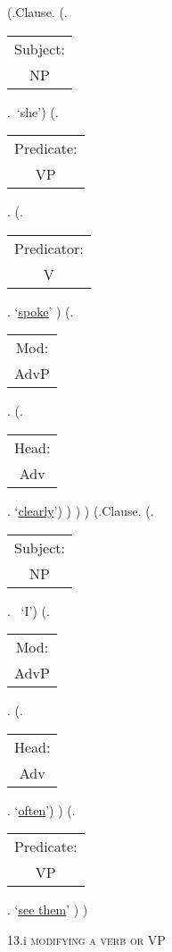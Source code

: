 \documentclass[12pt,letterpaper]{article}
\begin{document}
\begin{figure}
	\begin{center}
		\begin{parsetree}
			(.Clause.
			(.\begin{tabular}{c}Subject:\\NP\end{tabular}.~`she')
			(.\begin{tabular}{c}Predicate:\\VP\end{tabular}.
			(.\begin{tabular}{c}Predicator:\\V\end{tabular}. `\underline{\underline{spoke}}' )
			(.\begin{tabular}{c}Mod:\\AdvP\end{tabular}.  (.\begin{tabular}{c}Head:\\Adv\end{tabular}. `\underline{clearly}')
			)
			)
			)
			(.Clause.
			(.\begin{tabular}{c}Subject:\\NP\end{tabular}. ~`I')
			(.\begin{tabular}{c}Mod:\\AdvP\end{tabular}.  (.\begin{tabular}{c}Head:\\Adv\end{tabular}. `\underline{often}')
			)
			(.\begin{tabular}{c}Predicate:\\VP\end{tabular}. `\underline{\underline{see them}}' )
			)

			\hfill \break\hfill \break
		\end{parsetree}
		13.i \textsc{modifying a verb or VP}
	\end{center}
\end{figure}
\end{document}
